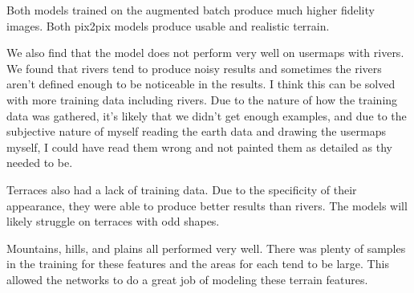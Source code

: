 \documentclass[twocolumn]{article}
\begin{document}
	Both models trained on the augmented batch produce much higher fidelity images. Both pix2pix models produce usable and realistic terrain.
	
	We also find that the model does not perform very well on usermaps with rivers. We found that rivers tend to produce noisy results and sometimes the rivers aren't defined enough to be noticeable in the results. I think this can be solved with more training data including rivers. Due to the nature of how the training data was gathered, it's likely that we didn't get enough examples, and due to the subjective nature of myself reading the earth data and drawing the usermaps myself, I could have read them wrong and not painted them as detailed as thy needed to be.
	
	Terraces also had a lack of training data. Due to the specificity of their appearance, they were able to produce better results than rivers. The models will likely struggle on terraces with odd shapes.
	
	Mountains, hills, and plains all performed very well. There was plenty of samples in the training for these features and the areas for each tend to be large. This allowed the networks to do a great job of modeling these terrain features.
\end{document}
